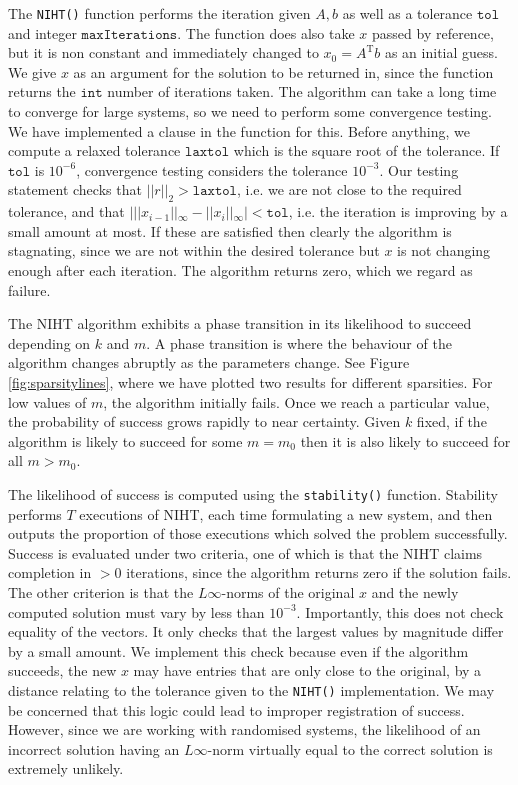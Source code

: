 \documentclass{article}
\begin{document}
The \texttt{NIHT()} function performs the iteration given $A, b$ as well as a tolerance $\mathtt{tol}$ and integer $\mathtt{maxIterations}$.
The function does also take $x$ passed by reference, but it is non constant and immediately changed to $x_0 = A^\mathrm{T}b$ as an initial guess.
We give $x$ as an argument for the solution to be returned in, since the function returns the $\mathtt{int}$ number of iterations taken.
The algorithm can take a long time to converge for large systems, so we need to perform some convergence testing.
We have implemented a clause in the function for this.
Before anything, we compute a relaxed tolerance $\mathtt{laxtol}$ which is the square root of the tolerance.
If $\mathtt{tol}$ is $10^{-6}$, convergence testing considers the tolerance $10^{-3}$.
Our testing statement checks that $||r||_2 > \mathtt{laxtol}$, i.e. we are not close to the required tolerance,
and that $| ||x_{i-1}||_\infty - ||x_i||_\infty | < \mathtt{tol}$, i.e. the iteration is improving by a small amount at most.
If these are satisfied then clearly the algorithm is stagnating, since we are not within the desired tolerance but $x$ is not changing enough after each iteration.
The algorithm returns zero, which we regard as failure.

The NIHT algorithm exhibits a phase transition in its likelihood to succeed depending on $k$ and $m$.
A phase transition is where the behaviour of the algorithm changes abruptly as the parameters change.
See Figure \ref{fig:sparsitylines}, where we have plotted two results for different sparsities.
For low values of $m$, the algorithm initially fails.
Once we reach a particular value, the probability of success grows rapidly to near certainty.
Given $k$ fixed, if the algorithm is likely to succeed for some $m = m_0$ then it is also likely to succeed for all $m > m_0$.

The likelihood of success is computed using the \texttt{stability()} function.
Stability performs $T$ executions of NIHT, each time formulating a new system,
and then outputs the proportion of those executions which solved the problem successfully.
Success is evaluated under two criteria, one of which is that the NIHT claims completion in $>0$ iterations,
since the algorithm returns zero if the solution fails.
The other criterion is that the $L\infty$-norms of the original $x$ and the newly computed solution must vary by less than $10^{-3}$.
Importantly, this does not check equality of the vectors. It only checks that the largest values by magnitude differ by a small amount.
We implement this check because even if the algorithm succeeds,
the new $x$ may have entries that are only close to the original, by a distance relating to the tolerance given to the \texttt{NIHT()} implementation.
We may be concerned that this logic could lead to improper registration of success.
However, since we are working with randomised systems,
the likelihood of an incorrect solution having an $L\infty$-norm virtually equal to the correct solution is extremely unlikely.
\end{document}
